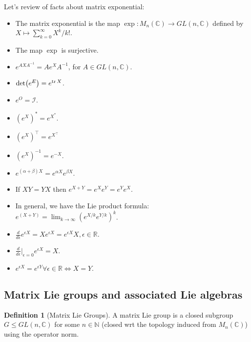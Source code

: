 \documentclass{book}
\theoremstyle{definition}
\newtheorem{defn}{Definition}[section]
\newcommand{\R}{\mathbb{R}}
\newcommand{\C}{\mathbb{C}}
\newcommand{\al}{\alpha}
\newcommand{\be}{\beta}
\newcommand{\ep}{\epsilon}
\newcommand{\f}[2]{\frac{#1}{#2}}
\newcommand{\lp}{\left(}
\newcommand{\rp}{\right)}
\newcommand{\Id}{\mathcal{I}}
\begin{document}
Let's review of facts about matrix exponential:
\begin{itemize}
	\item The matrix exponential is the map $\exp: M_n(\C) \to GL(n,\C)$ defined by $X \mapsto \sum^\infty_{k=0} X^k/k!$. 
	
	\item The map $\exp$ is surjective.
	
	\item $e^{AXA^{-1}} = A e^X A^{-1}$, for $A\in GL(n,\C)$.
	
	\item $\det(e^E) = e^{\tr X}$.
	
	\item $e^O = \Id$.
	
	\item $(e^X)^* = e^{X^*}$.
	
	\item $(e^X)^\top = e^{X^\top}$
	
	
	\item $(e^X)^{-1} = e^{-X}$. 
	
	\item $e^{(\al+\be )X} = e^{\al X} e^{\be X}$.
	
	\item If $XY=YX$ then $e^{X+Y} = e^X e^Y = e^Y e^X$.
	
	\item In general, we have the Lie product formula:  $e^{(X+Y)} = \lim_{k\to \infty}\lp e^{ X/k}e^{ Y/k} \rp^{k}$.
	
	
	\item $\f{d}{d\ep}e^{\ep X} = X e^{\ep X} = e^{\ep X} X, \ep \in \R$.
	
	\item $\f{d}{d\ep}\bigg\vert_{\ep =0}e^{\ep X} = X$.
	
	\item $e^{\ep X} = e^{\ep Y} \forall \ep \in \R \iff X=Y$.
\end{itemize}













\subsection{Matrix Lie groups and associated Lie algebras}

\begin{defn}[Matrix Lie Groups]
	A matrix Lie group is a closed subgroup  $G \leq GL(n,\mathbb{C})$ for some $n\in \mathbb{N}$ (closed wrt the topology induced from $M_n(\mathbb{C})$) using the  operator norm. 
\end{defn}
\end{document}
